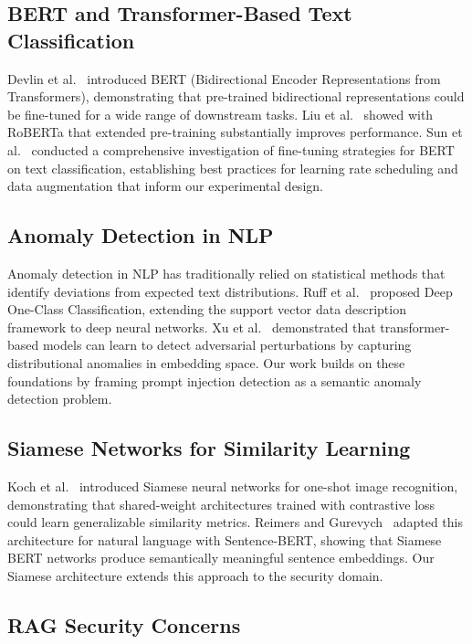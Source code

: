 \documentclass[11pt]{article}
\begin{document}
\subsection{BERT and Transformer-Based Text Classification}

Devlin et al.~\cite{devlin2019bert} introduced BERT (Bidirectional Encoder Representations from Transformers), demonstrating that pre-trained bidirectional representations could be fine-tuned for a wide range of downstream tasks. Liu et al.~\cite{liu2019roberta} showed with RoBERTa that extended pre-training substantially improves performance. Sun et al.~\cite{sun2019fine} conducted a comprehensive investigation of fine-tuning strategies for BERT on text classification, establishing best practices for learning rate scheduling and data augmentation that inform our experimental design.

\subsection{Anomaly Detection in NLP}

Anomaly detection in NLP has traditionally relied on statistical methods that identify deviations from expected text distributions. Ruff et al.~\cite{ruff2018deep} proposed Deep One-Class Classification, extending the support vector data description framework to deep neural networks. Xu et al.~\cite{xu2019bert} demonstrated that transformer-based models can learn to detect adversarial perturbations by capturing distributional anomalies in embedding space. Our work builds on these foundations by framing prompt injection detection as a semantic anomaly detection problem.

\subsection{Siamese Networks for Similarity Learning}

Koch et al.~\cite{koch2015siamese} introduced Siamese neural networks for one-shot image recognition, demonstrating that shared-weight architectures trained with contrastive loss could learn generalizable similarity metrics. Reimers and Gurevych~\cite{reimers2019sentence} adapted this architecture for natural language with Sentence-BERT, showing that Siamese BERT networks produce semantically meaningful sentence embeddings. Our Siamese architecture extends this approach to the security domain.

\subsection{RAG Security Concerns}
\end{document}
